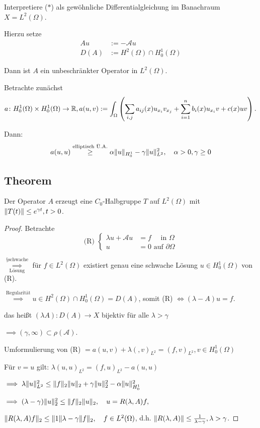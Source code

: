 Interpretiere ($\ast$) als gewöhnliche Differentialgleichung im Banachraum $X = L^2(\Omega)$.

Hierzu setze
\begin{align*}
  A u &:= -\mathcal{A} u \\
  D(A) &:= H^2(\Omega) \cap H_0^1(\Omega)
\end{align*}

Dann ist $A$ ein unbeschränkter Operator in $L^2(\Omega)$.

Betrachte zunächst
$$
  a \colon H_0^1(\Omega) \times H_0^1(\Omega) \to \mathbb{R}, 
  a(u,v) := \int_\Omega \left( \sum_{i,j} a_{ij}(x) u_{x_i} v_{x_j} + \sum_{i = 1}^n b_i(x) u_{x_i} v + c(x) uv \right).
$$

Dann: 
$$
  a(u,u) \overset{\text{elliptisch Ü.A.}}{\geq} \alpha \lVert u \rVert_{H_0^1} - \gamma \lVert u \rVert_{L^2}^2, \quad \alpha > 0, \gamma \geq 0
$$

\subsection{Theorem}

Der Operator $A$ erzeugt eine $C_0$-Halbgruppe $T$ auf $L^2(\Omega)$ mit $\lVert T(t) \rVert \leq e^{\gamma t}, t > 0$.

\begin{proof}
Betrachte
$$
\text{(R) } \begin{cases} \lambda u + \mathcal{A} u &= f \quad\text{ in } \Omega \\ u &= 0 \text{ auf } \partial \Omega \end{cases}
$$

$\overset{§ \text{schwache}}{\underset{\text{Lösung}}{\implies}}$  für $f \in L^2(\Omega)$ existiert genau eine schwache Lösung $u \in H_0^1(\Omega)$ von (R).

$\overset{\text{Regularität}}{\implies} u \in H^2(\Omega) \cap H_0^1(\Omega) = D(A)$, somit (R) $\iff (\lambda - A) u = f$.

das heißt $(\lambda A) \colon D(A) \to X$ bijektiv für alle $\lambda > \gamma$

$\implies (\gamma, \infty) \subset \rho(\mathcal{A})$.

Umformulierung von (R) $= a(u,v) + \lambda (,v)_{L^2} = (f, v)_{L^2}, v \in H_0^1(\Omega)$

Für $v = u$ gilt: $\lambda(u,u)_{L^2} = (f, u)_{L^2} - a(u,u)$

$\implies \lambda \lVert u \rVert_{L^2}^2 \leq \lVert f \rVert_2 \lVert u \rVert_2 + \gamma \lVert u \rVert_2^2 - \alpha \lVert u \rVert_{H_0^1}^2$

$\implies (\lambda - \gamma) \lVert u \rVert_2^2 \leq \lVert f \rVert_2 \lVert u \rVert_2, \quad u = R(\lambda, A) f,$

$\lVert R(\lambda, A) f \rVert_2 \leq \lVert 1 \rVert{\lambda - \gamma } \lVert f \rVert_2, \quad f \in L^2(\Omega)$, d.h. $\lVert R(\lambda, A) \rVert \leq \frac{1}{\lambda - \gamma}, \lambda > \gamma$.
\end{proof}


